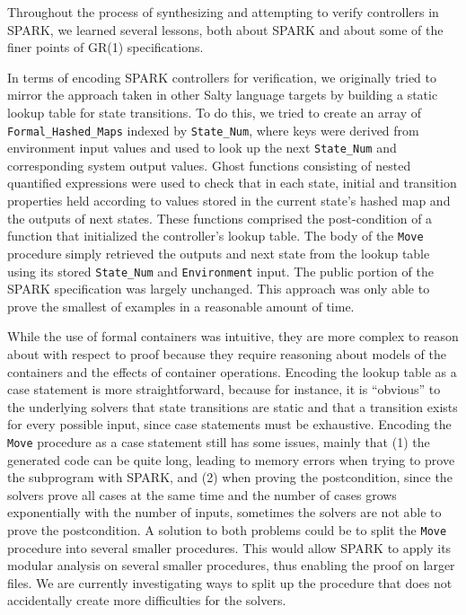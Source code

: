 \documentclass[runningheads]{llncs}
\begin{document}
Throughout the process of synthesizing and attempting to verify controllers in SPARK, we learned several lessons, 
both about SPARK and about some of the finer points of GR(1) specifications.

In terms of encoding SPARK controllers for verification, we originally tried to 
mirror the approach taken in other Salty language targets by building a static lookup table for state transitions. 
To do this, we tried to create an array of \lstinline{Formal_Hashed_Maps} indexed by \lstinline{State_Num}, where keys 
were derived from environment input values and used to look up the next \lstinline{State_Num} and corresponding system output values. 
Ghost functions consisting of nested quantified expressions were used to check that in each state, initial and transition properties held 
according to values stored in the current state's hashed map and the outputs of next states. 
These functions comprised the post-condition of a function that initialized the controller's lookup table. 
The body of the \lstinline{Move} procedure simply retrieved the outputs and next state from the lookup table 
using its stored \lstinline{State_Num} and \lstinline{Environment} input.
The public portion of the SPARK specification was largely unchanged.
This approach was only able to prove the smallest of examples in a reasonable amount of time. 

While the use of formal containers was intuitive, they are more complex to reason about with respect to proof 
because they require reasoning about models of the containers and the effects of container operations. 
Encoding the lookup table as a case statement is more straightforward, because for instance, 
it is ``obvious'' to the underlying solvers that state transitions are static and that a transition exists for every possible input, since 
case statements must be exhaustive. 
Encoding the \lstinline{Move} procedure as a case statement still has some issues, mainly that 
(1) the generated code can be quite long, leading to memory errors when trying to prove the subprogram with SPARK, and
(2) when proving the postcondition, since the solvers prove all cases at the same time and the number of cases grows 
exponentially with the number of inputs, sometimes the solvers are not able to prove the postcondition.
A solution to both problems could be to split the \lstinline{Move} procedure into several smaller procedures. %
This would allow SPARK to apply its modular analysis on several smaller procedures, thus enabling the proof on larger files. 
We are currently investigating ways to split up the procedure that does not accidentally create more difficulties for the solvers.
\end{document}
